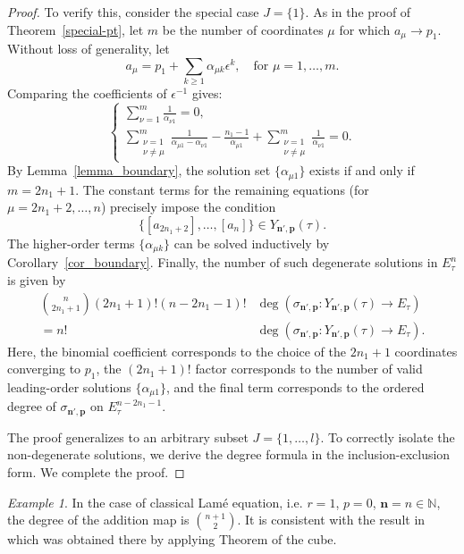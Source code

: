 \documentclass[11pt]{amsart}
\theoremstyle{remark}
\newtheorem{example}[theorem]{Example}
\numberwithin{equation}{section}
\begin{document}
\begin{proof}
To verify this, consider the special case $J=\{1\}$. As in the proof of Theorem~\ref{special-pt}, let $m$ be the number of coordinates $\mu$ for which $a_\mu \to p_1$. Without loss of generality, let 
\[
    a_\mu = p_1 + \sum_{k \ge 1} \alpha_{\mu k} \epsilon^k, \quad \text{for } \mu=1,\dots, m.
\]
Comparing the coefficients of $\epsilon^{-1}$ gives:
\[
\begin{cases}
    \displaystyle\sum_{\nu=1}^{m} \frac{1}{\alpha_{\nu 1}} = 0, \\[15pt]
    \displaystyle\sum_{\substack{\nu=1 \\ \nu \neq \mu}}^{m} \frac{1}{\alpha_{\mu 1} - \alpha_{\nu 1}} - \frac{n_1-1}{\alpha_{\mu 1}} + \sum_{\substack{\nu=1 \\ \nu \neq \mu}}^m \frac{1}{\alpha_{\nu 1}}  = 0.
\end{cases}
\]
By Lemma~\ref{lemma_boundary}, the solution set $\{ \alpha_{\mu 1} \}$ exists if and only if $m = 2n_1+1$. The constant terms for the remaining equations (for $\mu = 2n_1+2,\dots,n$) precisely impose the condition
\[
    \{[a_{2n_1+2}], \dots, [a_n]\} \in Y_{\mathbf{n}',\mathbf{p}}(\tau). 
\]
The higher-order terms $\{ \alpha_{\mu k} \}$ can be solved inductively by Corollary~\ref{cor_boundary}. Finally, the number of such degenerate solutions in $E_\tau^n$ is given by
\[
\begin{split}
    \binom{n}{2n_1+1} (2n_1+1)!  (n-2n_1-1)! & \deg ( \sigma_{\mathbf{n}',\mathbf{p}}: Y_{\mathbf{n}',\mathbf{p}}(\tau) \to E_\tau ) 
    \\
     = n! & \deg ( \sigma_{\mathbf{n}',\mathbf{p}}: Y_{\mathbf{n}',\mathbf{p}}(\tau) \to E_\tau ).
\end{split}
\]
Here, the binomial coefficient corresponds to the choice of the $2n_1+1$ coordinates converging to $p_1$, the $(2n_1+1)!$ factor corresponds to the number of valid leading-order solutions $\{ \alpha_{\mu 1} \}$, and the final term corresponds to the ordered degree of $\sigma_{\mathbf{n}',\mathbf{p}}$ on $E^{n-2n_1-1}_\tau$. 

The proof generalizes to an arbitrary subset $J = \{ 1,\dots,l \}$. To correctly isolate the non-degenerate solutions, we derive the degree formula in the inclusion-exclusion form. We complete the proof.
\end{proof}

\begin{example} 
In the case of classical Lam\'e equation, i.e. $r=1$, $p=0$, $\mathbf{n} = n \in \mathbb{N}$, the degree of the addition map is $\binom{n+1}{2}$. It is consistent with the result in \cite[Theorem~2.4]{Lin_Wang_2017} which was obtained there by applying Theorem of the cube.
\end{example}
\end{document}
